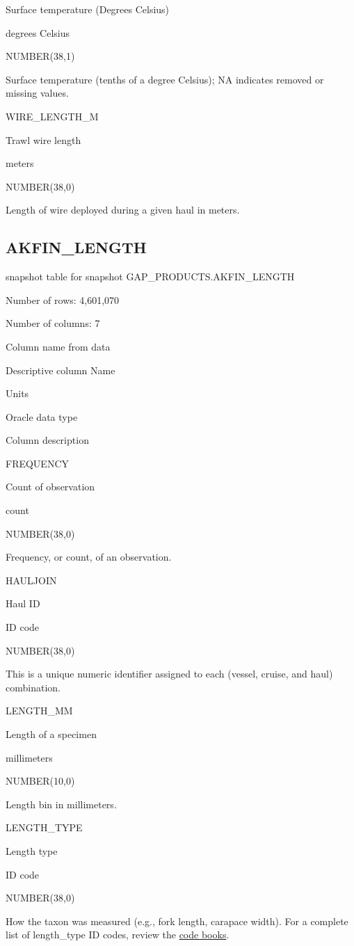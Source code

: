 \documentclass[
  letterpaper,
  oneside,
  open=any]{scrbook}
\begin{document}
Surface temperature (Degrees Celsius)

degrees Celsius

NUMBER(38,1)

Surface temperature (tenths of a degree Celsius); NA indicates removed
or missing values.

WIRE\_LENGTH\_M

Trawl wire length

meters

NUMBER(38,0)

Length of wire deployed during a given haul in meters.

\hypertarget{akfin_length}{%
\subsection{AKFIN\_LENGTH}\label{akfin_length}}

snapshot table for snapshot GAP\_PRODUCTS.AKFIN\_LENGTH

Number of rows: 4,601,070

Number of columns: 7

Column name from data

Descriptive column Name

Units

Oracle data type

Column description

FREQUENCY

Count of observation

count

NUMBER(38,0)

Frequency, or count, of an observation.

HAULJOIN

Haul ID

ID code

NUMBER(38,0)

This is a unique numeric identifier assigned to each (vessel, cruise,
and haul) combination.

LENGTH\_MM

Length of a specimen

millimeters

NUMBER(10,0)

Length bin in millimeters.

LENGTH\_TYPE

Length type

ID code

NUMBER(38,0)

How the taxon was measured (e.g., fork length, carapace width). For a
complete list of length\_type ID codes, review the
\href{https://www.fisheries.noaa.gov/resource/document/groundfish-survey-species-code-manual-and-data-codes-manual}{code
books}.
\end{document}
